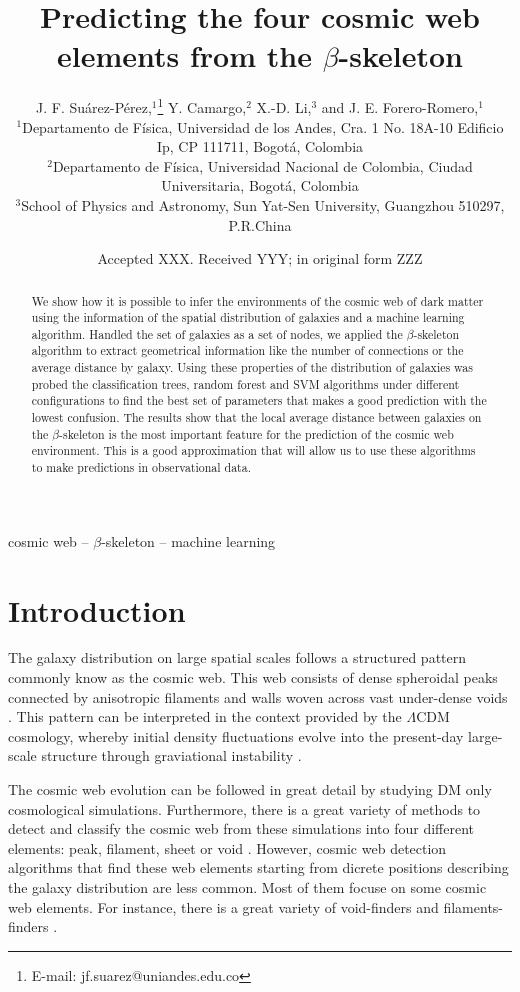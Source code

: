 \documentclass[usenatbib]{mnras}
\title[Cosmic web elements and the $\beta$-skeleton]{Predicting the four cosmic web
  elements from the $\beta$-skeleton}
\author[J. F. Su\'arez-P\'erez et al.]{
J. F. Su\'arez-P\'erez,$^{1}$\thanks{E-mail: jf.suarez@uniandes.edu.co}
Y. Camargo,$^{2}$ 
X.-D. Li,$^{3}$
and J. E. Forero-Romero,$^{1}$
\\
$^{1}$Departamento de F\'isica, Universidad de los Andes, Cra. 1 No. 18A-10 Edificio Ip, CP 111711, Bogot\'a, Colombia\\
$^{2}$Departamento de F\'isica, Universidad Nacional de Colombia, Ciudad Universitaria, Bogot\'a, Colombia\\
$^{3}$School of Physics and Astronomy, Sun Yat-Sen University, Guangzhou 510297, P.R.China\\
}
\date{Accepted XXX. Received YYY; in original form ZZZ}
\begin{document}
\label{firstpage}
\pagerange{\pageref{firstpage}--\pageref{lastpage}}
\maketitle

\begin{abstract}
We show how it is possible to infer the environments of the cosmic web
of dark matter using the information of the spatial distribution of
galaxies and a machine learning algorithm. 
Handled the set of galaxies as a set of nodes, we applied the
$\beta$-skeleton algorithm to extract geometrical information like the
number of connections or the average distance by galaxy. 
Using these properties of the distribution of galaxies was probed the
classification trees, random forest and SVM algorithms under different
configurations to find the best set of parameters that makes a good
prediction with the lowest confusion.  
The results show that the local average distance between galaxies on
the $\beta$-skeleton is the most important feature for the prediction
of the cosmic web environment. 
This is a good approximation that will allow us to use these
algorithms to make predictions in observational data.  
\end{abstract}

\begin{keywords}
cosmic web -- $\beta$-skeleton -- machine learning
\end{keywords}


\section{Introduction}
The galaxy distribution on large spatial scales follows a structured 
pattern commonly know as the cosmic web. 
This web consists of dense spheroidal peaks connected by
anisotropic filaments and walls woven across vast under-dense voids
\citep{Bond1996}. 
This pattern can be interpreted in the context provided by the
$\Lambda$CDM cosmology, whereby initial density fluctuations   evolve
into the present-day large-scale structure through graviational
instability \citep{ZelDovich1970,White1987}.  

The cosmic web evolution can be followed in great detail by studying
DM only cosmological simulations. 
Furthermore, there is a great variety of methods to detect and
classify the cosmic web from these simulations into four different
elements: peak, filament, sheet or void \citep{Libeskind2018}.  
However, cosmic web detection algorithms that find these web elements
starting from dicrete positions describing the galaxy distribution are
less common.
Most of them focuse on some cosmic web elements.
For instance, there is a great variety of void-finders
\citep{Platen2007,Neyrinck2008,Ravoux2020} and filaments-finders
\citep{Novikov2003,Zhang2009,Sousbie2010,Chen2015,Luber2019,Malavasi2020}.   
\end{document}
